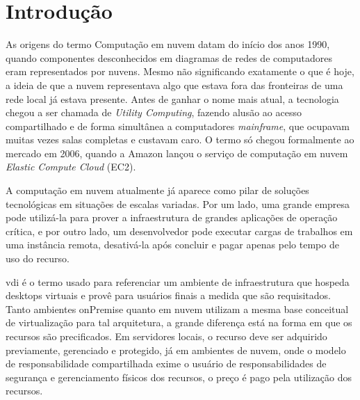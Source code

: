 
\chapter{Introdução}
\label{cap:introducao}

As origens do termo Computação em nuvem datam do início dos anos 1990, quando componentes desconhecidos em diagramas de redes de computadores eram representados por nuvens. Mesmo não significando exatamente o que é hoje, a ideia de que a nuvem representava algo que estava fora das fronteiras de uma rede local já estava presente. Antes de ganhar o nome mais atual, a tecnologia chegou a ser chamada de \textit{Utility Computing}, fazendo alusão ao acesso compartilhado e de forma simultânea a computadores \textit{mainframe}, que ocupavam muitas vezes salas completas e custavam caro. O termo só chegou formalmente ao mercado em 2006, quando a Amazon lançou o serviço de computação em nuvem \textit{Elastic Compute Cloud} (EC2). \citep{cloudcomputingcambridge}

A computação em nuvem atualmente já aparece como pilar de soluções tecnológicas em situações de
escalas variadas. Por um lado, uma grande empresa pode utilizá-la para prover a infraestrutura de
grandes aplicações de operação crítica, e por outro lado, um desenvolvedor pode executar cargas de
trabalhos em uma instância remota, desativá-la após concluir e pagar apenas pelo tempo de uso do
recurso. \citep{taurioncloud}

\gls{vdi} é o termo usado para referenciar um ambiente de infraestrutura que hospeda \glspl{desktop} virtuais e provê para usuários finais a medida que são requisitados. Tanto ambientes \gls{onPremise} quanto em nuvem utilizam a mesma base conceitual de virtualização para tal arquitetura, a grande diferença está na forma em que os recursos são precificados. Em servidores locais, o recurso deve ser adquirido previamente, gerenciado e protegido, já em ambientes de nuvem, onde o modelo de responsabilidade compartilhada exime o usuário de responsabilidades de segurança e gerenciamento físicos dos recursos, o preço é pago pela utilização dos recursos. \citep{cloudcomputingcambridge}

